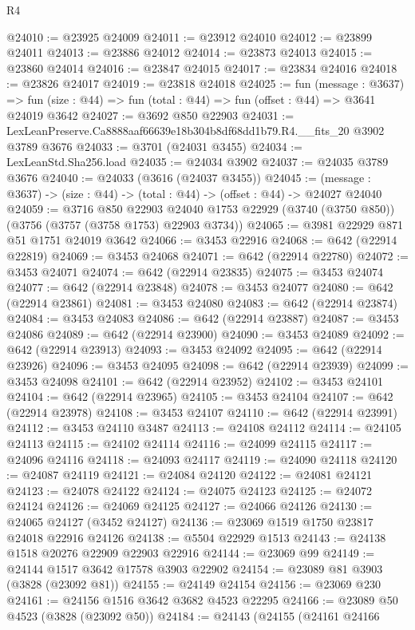\begin{lexlean}{R4}
\begin{coremodule}
@24010 := @23925 @24009
@24011 := @23912 @24010
@24012 := @23899 @24011
@24013 := @23886 @24012
@24014 := @23873 @24013
@24015 := @23860 @24014
@24016 := @23847 @24015
@24017 := @23834 @24016
@24018 := @23826 @24017
@24019 := @23818 @24018
@24025 := fun (message : @3637) =>
  fun (size : @44) => fun (total : @44) => fun (offset : @44) => @3641 @24019 @3642
@24027 := @3692 @850 @22903
@24031 := LexLeanPreserve.Ca8888aaf66639e18b304b8df68dd1b79.R4.__fits_20 @3902 @3789 @3676
@24033 := @3701 (@24031 @3455)
@24034 := LexLeanStd.Sha256.load
@24035 := @24034 @3902
@24037 := @24035 @3789 @3676
@24040 := @24033 (@3616 (@24037 @3455))
@24045 := (message : @3637) -> (size : @44) -> (total : @44) -> (offset : @44) -> @24027 @24040
@24059 := @3716
    @850
    @22903
    @24040
    @1753
    @22929
    (@3740 (@3750 @850))
    (@3756 (@3757 (@3758 @1753) @22903 @3734))
@24065 := @3981 @22929 @871 @51 @1751 @24019 @3642
@24066 := @3453 @22916
@24068 := @642 (@22914 @22819)
@24069 := @3453 @24068
@24071 := @642 (@22914 @22780)
@24072 := @3453 @24071
@24074 := @642 (@22914 @23835)
@24075 := @3453 @24074
@24077 := @642 (@22914 @23848)
@24078 := @3453 @24077
@24080 := @642 (@22914 @23861)
@24081 := @3453 @24080
@24083 := @642 (@22914 @23874)
@24084 := @3453 @24083
@24086 := @642 (@22914 @23887)
@24087 := @3453 @24086
@24089 := @642 (@22914 @23900)
@24090 := @3453 @24089
@24092 := @642 (@22914 @23913)
@24093 := @3453 @24092
@24095 := @642 (@22914 @23926)
@24096 := @3453 @24095
@24098 := @642 (@22914 @23939)
@24099 := @3453 @24098
@24101 := @642 (@22914 @23952)
@24102 := @3453 @24101
@24104 := @642 (@22914 @23965)
@24105 := @3453 @24104
@24107 := @642 (@22914 @23978)
@24108 := @3453 @24107
@24110 := @642 (@22914 @23991)
@24112 := @3453 @24110 @3487
@24113 := @24108 @24112
@24114 := @24105 @24113
@24115 := @24102 @24114
@24116 := @24099 @24115
@24117 := @24096 @24116
@24118 := @24093 @24117
@24119 := @24090 @24118
@24120 := @24087 @24119
@24121 := @24084 @24120
@24122 := @24081 @24121
@24123 := @24078 @24122
@24124 := @24075 @24123
@24125 := @24072 @24124
@24126 := @24069 @24125
@24127 := @24066 @24126
@24130 := @24065 @24127 (@3452 @24127)
@24136 := @23069 @1519 @1750 @23817 @24018 @22916 @24126
@24138 := @5504 @22929 @1513
@24143 := @24138 @1518 @20276 @22909 @22903 @22916
@24144 := @23069 @99
@24149 := @24144 @1517 @3642 @17578 @3903 @22902
@24154 := @23089 @81 @3903 (@3828 (@23092 @81))
@24155 := @24149 @24154
@24156 := @23069 @230
@24161 := @24156 @1516 @3642 @3682 @4523 @22295
@24166 := @23089 @50 @4523 (@3828 (@23092 @50))
@24184 := @24143
    (@24155
      (@24161
        @24166

\end{coremodule}
\end{lexlean}
